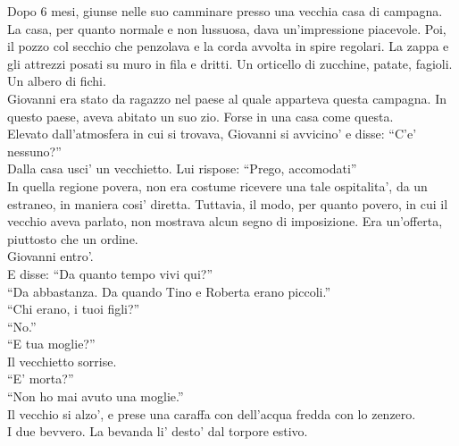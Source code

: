 Dopo 6 mesi, giunse nelle suo camminare presso una vecchia casa di campagna. La casa, per quanto normale e non lussuosa, dava un'impressione piacevole. Poi, il pozzo col secchio che penzolava e la corda avvolta in spire regolari. La zappa e gli attrezzi posati su muro in fila e dritti. Un orticello di zucchine, patate, fagioli. Un albero di fichi.\\
Giovanni era stato da ragazzo nel paese al quale apparteva questa campagna. In questo paese, aveva abitato un suo zio. Forse in una casa come questa.\\
Elevato dall'atmosfera in cui si trovava, Giovanni si avvicino' e disse: \enquote{C'e' nessuno?}\\

Dalla casa usci' un vecchietto. Lui rispose: \enquote{Prego, accomodati}\\
In quella regione povera, non era costume ricevere una tale ospitalita', da un estraneo, in maniera cosi' diretta. Tuttavia, il modo, per quanto povero, in cui il vecchio aveva parlato, non mostrava alcun segno di imposizione. Era un'offerta, piuttosto che un ordine.\\
Giovanni entro'.\\
E disse: \enquote{Da quanto tempo vivi qui?}\\
\enquote{Da abbastanza. Da quando Tino e Roberta erano piccoli.}\\
\enquote{Chi erano, i tuoi figli?}\\
\enquote{No.}\\
\enquote{E tua moglie?}\\
Il vecchietto sorrise.\\
\enquote{E' morta?}\\
\enquote{Non ho mai avuto una moglie.}\\

Il vecchio si alzo', e prese una caraffa con dell'acqua fredda con lo zenzero.\\
I due bevvero. La bevanda li' desto' dal torpore estivo.\\

